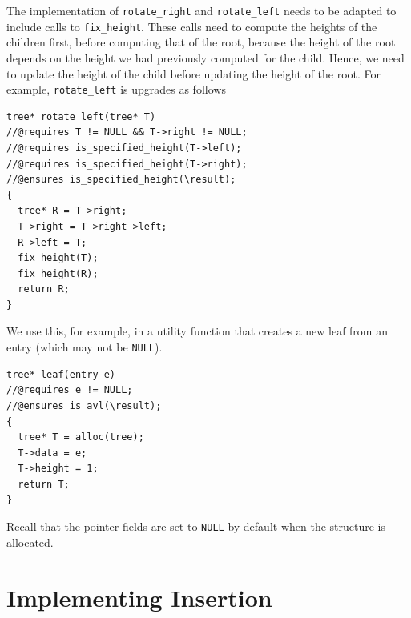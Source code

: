 The implementation of \lstinline'rotate_right' and
\lstinline'rotate_left' needs to be adapted to include calls to
\lstinline'fix_height'. These calls need to compute the heights of the
children first, before computing that of the root, because the height of the
root depends on the height we had previously computed for the child. Hence, we
need to update the height of the child before updating the height of the root.
For example, \lstinline'rotate_left' is upgrades as follows
\newpage
\begin{lstlisting}[language={[C0]C}]
tree* rotate_left(tree* T)
//@requires T != NULL && T->right != NULL;
//@requires is_specified_height(T->left);
//@requires is_specified_height(T->right);
//@ensures is_specified_height(\result);
{
  tree* R = T->right;
  T->right = T->right->left;
  R->left = T;
  fix_height(T);
  fix_height(R);
  return R;
}
\end{lstlisting}


We use this, for example, in a utility function that creates
a new leaf from an entry (which may not be \lstinline'NULL').
\begin{lstlisting}[language={[C0]C}]
tree* leaf(entry e)
//@requires e != NULL;
//@ensures is_avl(\result);
{
  tree* T = alloc(tree);
  T->data = e;
  T->height = 1;
  return T;
}
\end{lstlisting}
Recall that the pointer fields are set to \lstinline'NULL' by default when the
structure is allocated.


\newpage
\section{Implementing Insertion}
\label{sec:avl:insertion_impl}

